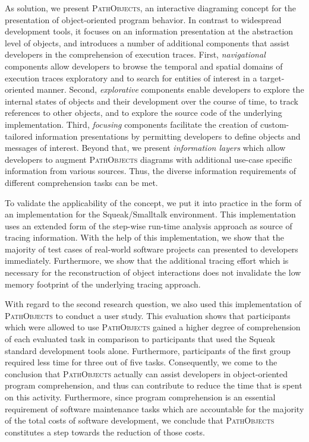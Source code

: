 As solution, we present \textsc{PathObjects}, an interactive diagraming concept for the presentation of object-oriented program behavior.
In contrast to widespread development tools, it focuses on an information presentation at the abstraction level of objects, and introduces a number of additional components that assist developers in the comprehension of execution traces.
First, \textit{navigational} components allow developers to browse the temporal and spatial domains of execution traces exploratory and to search for entities of interest in a target-oriented manner.
Second, \textit{explorative} components enable developers to explore the internal states of objects and their development over the course of time, to track references to other objects, and to explore the source code of the underlying implementation.
Third, \textit{focusing} components facilitate the creation of custom-tailored information presentations by permitting developers to define objects and messages of interest.
Beyond that, we present \textit{information layers} which allow developers to augment \textsc{PathObjects} diagrams with additional use-case specific information from various sources.
Thus, the diverse information requirements of different comprehension tasks can be met.

To validate the applicability of the concept, we put it into practice in the form of an implementation for the Squeak/Smalltalk environment.
This implementation uses an extended form of the step-wise run-time analysis approach as source of tracing information.
With the help of this implementation, we show that the majority of test cases of real-world software projects can presented to developers immediately.
Furthermore, we show that the additional tracing effort which is necessary for the reconstruction of object interactions does not invalidate the low memory footprint of the underlying tracing approach.

With regard to the second research question, we also used this implementation of \textsc{PathObjects} to conduct a user study.
This evaluation shows that participants which were allowed to use \textsc{PathObjects} gained a higher degree of comprehension of each evaluated task in comparison to participants that used the Squeak standard development tools alone.
Furthermore, participants of the first group required less time for three out of five tasks.
Consequently, we come to the conclusion that \textsc{PathObjects} actually can assist developers in object-oriented program comprehension, and thus can contribute to reduce the time that is spent on this activity.
Furthermore, since program comprehension is an essential requirement of software maintenance tasks which are accountable for the majority of the total costs of software development, we conclude that \textsc{PathObjects} constitutes a step towards the reduction of those costs.

